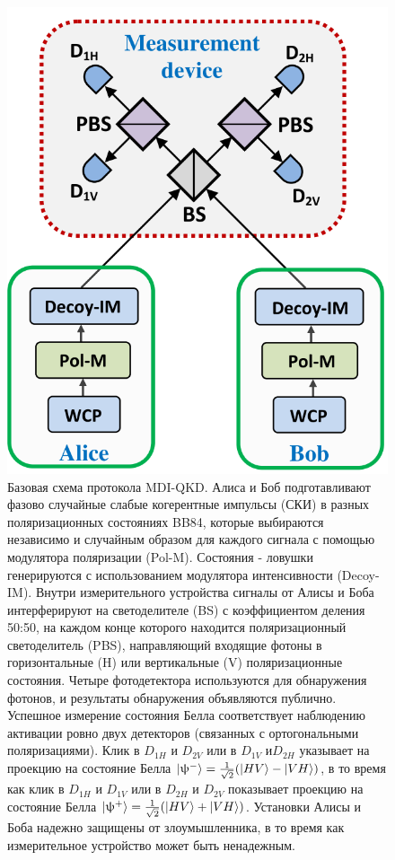 \begin{figure}
    \centering
    \includegraphics[width=0.7\linewidth]{images/MDi scheme.png}
    \caption{Базовая схема протокола MDI-QKD.
Алиса и Боб подготавливают фазово случайные слабые когерентные импульсы (СКИ) в разных поляризационных состояниях BB84, которые выбираются независимо и случайным образом для каждого сигнала с помощью модулятора поляризации (Pol-M). Состояния - ловушки генерируются с использованием модулятора интенсивности (Decoy-IM). Внутри измерительного устройства сигналы от Алисы и Боба интерферируют на светоделителе  (BS) с коэффициентом деления 50:50, на каждом конце которого находится поляризационный светоделитель (PBS), направляющий входящие фотоны в горизонтальные (H) или вертикальные (V) поляризационные состояния. Четыре фотодетектора используются для обнаружения фотонов, и результаты обнаружения объявляются публично. Успешное измерение состояния Белла соответствует наблюдению активации ровно двух детекторов (связанных с ортогональными поляризациями). Клик в $D_{1H}$ и $D_{2V}$ или в $D_{1V}$ и$D_{2H}$ указывает на проекцию на состояние Белла $\lvert\uppsi^{-}\rangle = \frac{1}{\sqrt{2}}(\lvert HV\rangle - \lvert VH\rangle)$, в то время как клик в $D_{1H}$ и $D_{1V}$ или в $D_{2H}$ и $D_{2V}$ показывает проекцию на состояние Белла $\lvert\uppsi^{+}\rangle = \frac{1}{\sqrt{2}}(\lvert HV\rangle + \lvert VH\rangle)$. Установки Алисы и Боба надежно защищены от злоумышленника, в то время как измерительное устройство может быть ненадежным.
}
\end{figure} \label{fig:MDI scheme lit}

